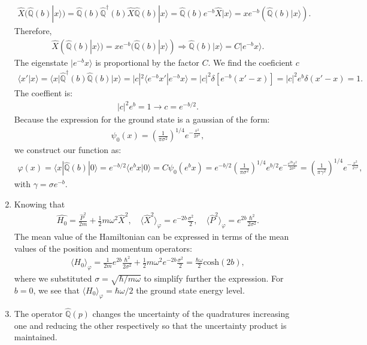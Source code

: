 \documentclass[letterpaper,11pt,twoside]{article}
\newcommand{\ket}[1]{|#1\rangle}
\newcommand{\braket}[1]{\langle#1\rangle}
\begin{document}
\begin{enumerate}[itemsep=0pt,topsep=0pt,label=\alph*)]
  \begin{align*}
    \hat{X}(\hat{\mathbb{Q}}(b)\ket{x})=\hat{\mathbb{Q}}(b)\hat{\mathbb{Q}}^\dagger(b)\hat{X}\hat{\mathbb{Q}}(b)\ket{x}=\hat{\mathbb{Q}}(b)e^{-b}\hat{X}\ket{x}=xe^{-b}(\hat{\mathbb{Q}}(b)\ket{x}).
  \end{align*}
  Therefore, 
  \begin{align*}
    \hat{X}(\hat{\mathbb{Q}}(b)\ket{x})=xe^{-b}(\hat{\mathbb{Q}}(b)\ket{x})\Longrightarrow\hat{\mathbb{Q}}(b)\ket{x}=C\ket{e^{-b}x}.
  \end{align*}
  The eigenstate $\ket{e^{-b}x}$ is proportional by the factor $C$. We find the coeficient $c$
  \begin{align*}
    \braket{x'|x}=\braket{x|\hat{\mathbb{Q}}^\dagger(b)\hat{\mathbb{Q}}(b)|x}=|c|^2\braket{e^{-b}x'|e^{-b}x}=|c|^2\delta[e^{-b}(x'-x)]=|c|^2e^b\delta(x'-x)=1.
  \end{align*}
  The coeffient is:
  \begin{align*}
    |c|^2e^b=1\longrightarrow c=e^{-b/2}.
  \end{align*}
  Because the expression for the ground state is a gaussian of the form:
  \begin{align*}
    \psi_0(x)=\left(\frac{1}{\pi\sigma^2}\right)^{1/4}e^{-\frac{x^2}{2\sigma^2}},
  \end{align*}
  we construct our function as:
  \begin{align*}
    \varphi(x)=\braket{x|\hat{\mathbb{Q}}(b)|0}=e^{-b/2}\braket{e^bx|0}=C\psi_0(e^bx)=e^{-b/2}\left(\frac{1}{\pi\sigma^2}\right)^{1/4}e^{b/2}e^{-\frac{e^{2b}x^2}{2\sigma^2}}=\left(\frac{1}{\pi\gamma^2}\right)^{1/4}e^{-\frac{x^2}{2\gamma^2}},
  \end{align*}
  with $\gamma=\sigma e^{-b}$.
  \item Knowing that 
  \begin{align*}
    \hat{H_0}=\frac{\hat{P}^2}{2m}+\frac{1}{2}m\omega^2\hat{X}^2,\quad \braket{\hat{X}^2}_\varphi=e^{-2b}\frac{\sigma^2}{2},\quad \braket{\hat{P}^2}_\varphi=e^{2b}\frac{\hbar^2}{2\sigma^2}.
  \end{align*}
  The mean value of the Hamiltonian can be expressed in terms of the mean values of the position and momentum operators:
  \begin{align*}
    \braket{H_0}_\varphi=\frac{1}{2m}e^{2b}\frac{\hbar^2}{2\sigma^2}+\frac{1}{2}m\omega^2e^{-2b}\frac{\sigma^2}{2}=\frac{\hbar\omega}{2}\text{cosh}(2b),
  \end{align*}
  where we substituted $\sigma=\sqrt{\hbar/m\omega}$ to simplify further the expression. For $b=0$, we see that $\braket{H_0}_\varphi=\hbar\omega/2$ the ground state energy level.
  \item The operator $\hat{\mathbb{Q}}(p)$ changes the uncertainty of the quadratures increasing one and reducing the other respectively so that the uncertainty product is maintained.
\end{enumerate}
\end{document}
